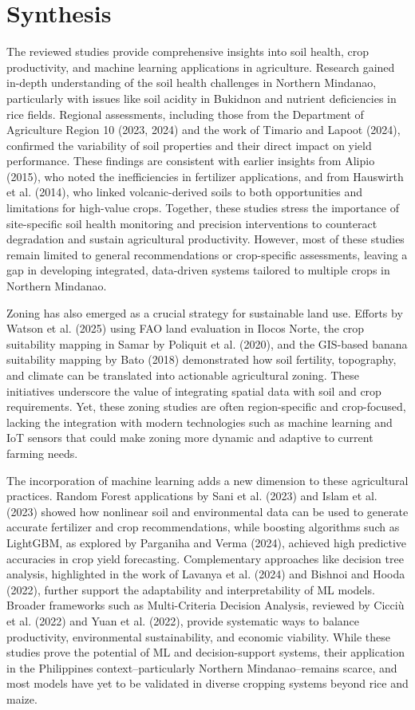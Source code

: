 {\section{Synthesis}
The reviewed studies provide comprehensive insights into soil health, crop productivity, and machine learning applications in agriculture. Research gained in-depth understanding of the soil health challenges in Northern Mindanao, particularly with issues like soil acidity in Bukidnon and nutrient deficiencies in rice fields. Regional assessments, including those from the Department of Agriculture Region 10 (2023, 2024) and the work of Timario and Lapoot (2024), confirmed the variability of soil properties and their direct impact on yield performance. These findings are consistent with earlier insights from Alipio (2015), who noted the inefficiencies in fertilizer applications, and from Hauswirth et al. (2014), who linked volcanic-derived soils to both opportunities and limitations for high-value crops. Together, these studies stress the importance of site-specific soil health monitoring and precision interventions to counteract degradation and sustain agricultural productivity. However, most of these studies remain limited to general recommendations or crop-specific assessments, leaving a gap in developing integrated, data-driven systems tailored to multiple crops in Northern Mindanao.

Zoning has also emerged as a crucial strategy for sustainable land use. Efforts by Watson et al. (2025) using FAO land evaluation in Ilocos Norte, the crop suitability mapping in Samar by Poliquit et al. (2020), and the GIS-based banana suitability mapping by Bato (2018) demonstrated how soil fertility, topography, and climate can be translated into actionable agricultural zoning. These initiatives underscore the value of integrating spatial data with soil and crop requirements. Yet, these zoning studies are often region-specific and crop-focused, lacking the integration with modern technologies such as machine learning and IoT sensors that could make zoning more dynamic and adaptive to current farming needs.

The incorporation of machine learning adds a new dimension to these agricultural practices. Random Forest applications by Sani et al. (2023)	and Islam et al. (2023) showed how nonlinear soil and environmental data can be used to generate accurate fertilizer and crop recommendations, while boosting algorithms such as LightGBM, as explored by Parganiha and Verma (2024), achieved high predictive accuracies in crop yield forecasting. Complementary approaches like decision tree analysis, highlighted in the work of Lavanya et al. (2024) and Bishnoi and Hooda (2022), further support the adaptability and interpretability of ML models. Broader frameworks such as Multi-Criteria Decision Analysis, reviewed by Cicciù et al. (2022) and Yuan et al. (2022), provide systematic ways to balance productivity, environmental sustainability, and economic viability. While these studies prove the potential of ML and decision-support systems, their application in the Philippines context–particularly Northern Mindanao–remains scarce, and most models have yet to be validated in diverse cropping systems beyond rice and maize.

}
